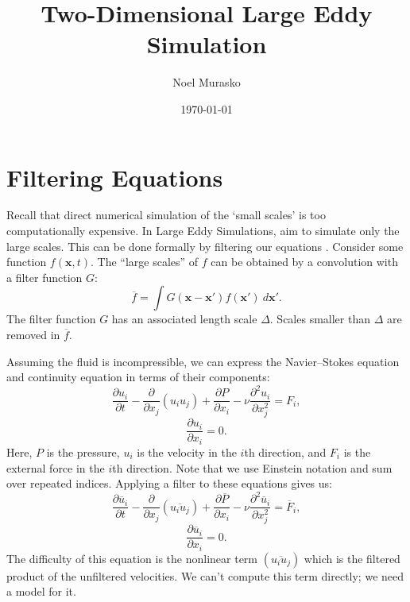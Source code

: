 \documentclass[11pt,a4paper]{article}
\author{Noel Murasko}
\title{Two-Dimensional Large Eddy Simulation}
\date{\today}
\begin{document}
\maketitle
\noindent 
\section{Filtering Equations}
Recall that direct numerical simulation of the `small scales' is too computationally expensive. In Large Eddy Simulations, aim to simulate only the large scales. This can be done formally by filtering our equations \cite{Leonard1974}. Consider some function $f(\boldsymbol{x}, t)$. The ``large scales'' of $f$ can be obtained by a convolution with a filter function $G$:
$$\overline{f} = \int G(\boldsymbol{x} - \boldsymbol{x}')f(\boldsymbol{x}')\ d\boldsymbol{x}'.$$
The filter function $G$ has an associated length scale $\Delta$. Scales smaller than $\Delta$ are removed in $\overline{f}$. 

Assuming the fluid is incompressible, we can express the Navier--Stokes equation and continuity equation in terms of their components:
$$\frac{\partial u_i}{\partial t} - \frac{\partial }{\partial x_j}(u_iu_j)+\frac{\partial P}{\partial x_i}- \nu \frac{\partial^2u_i}{\partial x_j^2} = F_i,$$
$$\frac{\partial u_i}{\partial x_i}  =0.$$
Here, $P$ is the pressure, $u_i$ is the velocity in the $i$th direction, and $F_i$ is the external force in the $i$th direction. Note that we use Einstein notation and sum over repeated indices. Applying a filter to these equations gives us:
$$\frac{\partial \overline{u}_i}{\partial t} - \frac{\partial }{\partial x_j}\left(\overline{u_iu_j}\right)+\frac{\partial \overline{P}}{\partial x_i}- \nu \frac{\partial^2\overline{u}_i}{\partial x_j^2}= \overline{F}_i,$$
$$\frac{\partial \overline{u}_i}{\partial x_i}  =0.$$
The difficulty of this equation is the nonlinear term $\left(\overline{u_iu_j}\right)$ which is the filtered product of the unfiltered velocities. We can't compute this term directly; we need a model for it.
\end{document}
